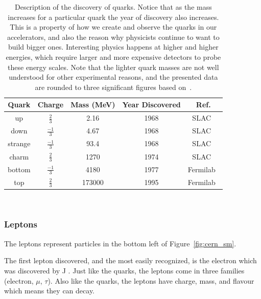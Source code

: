 \begin{table}
\begin{center}
\begin{tabular}{||c c c c c||}
 \hline
 Quark & Charge & Mass (MeV) & Year Discovered & Ref.\\ [0.5ex]
 \hline\hline
 up & $\frac{2}{3}$ & 2.16 & 1968 & SLAC~\citep{1969PhRvL..23..930B, 1969PhRvL..23..935B} \\
 \hline
 down & $\frac{-1}{3}$ & 4.67 & 1968 & SLAC~\citep{1969PhRvL..23..930B, 1969PhRvL..23..935B} \\
 \hline
 strange & $\frac{-1}{3}$ & 93.4 & 1968 & SLAC~\citep{1969PhRvL..23..930B, 1969PhRvL..23..935B} \\
 \hline
 charm & $\frac{2}{3}$ & 1270 & 1974 & SLAC~\citep{Jpsi_PhysRevLett.33.1404} \\
 \hline
 bottom & $\frac{-1}{3}$ & 4180 & 1977 & Fermilab~\citep{bottom_PhysRevLett.39.252}\\
 \hline
 top & $\frac{2}{3}$ & 173000 & 1995 & Fermilab~\citep{topquark_Abachi_1995} \\
 \hline
\end{tabular}
\caption{Description of the discovery of quarks. Notice that as the mass increases for a particular quark the year of discovery also increases. This is a property of how we create and observe the quarks in our accelerators, and also the reason why physicists continue to want to build bigger ones. Interesting physics happens at higher and higher energies, which require larger and more expensive detectors to probe these energy scales. Note that the lighter quark masses are not well understood for other experimental reasons, and the presented data are rounded to three significant figures based on~\citep{Workman:2022ynf}.}
\end{center}
\end{table}
~\label{table:quark}

\subsubsection{Leptons}

The leptons represent particles in the bottom left of Figure~\ref{fig:cern_sm}.

The first lepton discovered, and the most easily recognized, is the electron which was discovered by J .
Just like the quarks, the leptons come in three families (electron, $\mu$, $\tau$).
Also like the quarks, the leptons have charge, mass, and flavour which means they can decay.

